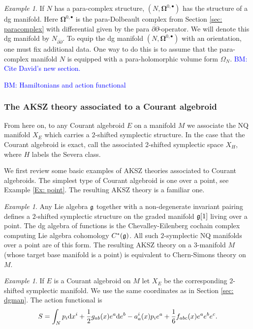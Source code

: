 \documentclass{article}
\newcommand{\p}{\partial}
\newcommand{\pd}{\overline{\p\!\!\!\p}}
\def\d{{\rm d}}
\theoremstyle{definition}
\theoremstyle{remark}
\newtheorem{Ex}[theorem]{Example}
\def\brian{\textcolor{blue}{BM: }\textcolor{blue}}
\begin{document}
\begin{Ex}
If $N$ has a para-complex structure, $(N, \mathbf{\Omega}^{0,\bullet})$ has the structure of a dg manifold. 
Here $\mathbf{\Omega}^{0,\bullet}$ is the para-Dolbeault complex from Section \ref{sec: paracomplex} with differential given by the para $\pd$-operator. 
We will denote this dg manifold by $N_{\pd}$. 
To equip the dg manifold $(N, \mathbf{\Omega}^{0,\bullet})$ with an orientation, one must fix additional data. 
One way to do this is to assume that the para-complex manifold $N$ is equipped with a para-holomorphic volume form $\Omega_N$. \brian{Cite David's new section.}
\end{Ex}

\brian{Hamiltonians and action functional}

\subsubsection{The AKSZ theory associated to a Courant algebroid}

From here on, to any Courant algebroid $E$ on a manifold $M$ we associate the NQ manifold $X_E$ which carries a $2$-shifted symplectic structure. 
In the case that the Courant algebroid is exact, call the associated $2$-shifted symplectic space $X_H$, where $H$ labels the Severa class. 

We first review some basic examples of AKSZ theories associated to Courant algebroids. 
The simplest type of Courant algebroid is one over a point, see Example \ref{Ex: point}. 
The resulting AKSZ theory is a familiar one.

\begin{Ex}\label{ex: cs}
Any Lie algebra $\mathfrak{g}$ together with a non-degenerate invariant pairing defines a $2$-shifted symplectic structure on the graded manifold $\mathfrak{g}[1]$ living over a point. 
The dg algebra of functions is the Chevalley-Eilenberg cochain complex computing Lie algebra cohomology $C^*(\mathfrak{g})$. 
All such $2$-symplectic NQ manifolds over a point are of this form. 
The resulting AKSZ theory on a $3$-manifold $M$ (whose target base manifold is a point) is equivalent to Chern-Simons theory on $M$. 
\end{Ex}

\begin{Ex} \label{ex: exact CA}
If $E$ is a Courant algebroid on $M$ let $X_E$ be the corresponding $2$-shifted symplectic manifold.
We use the same coordinates as in Section \ref{sec: dgman}.
The action functional is
\[
S = \int_N p_i \d x^i + \frac{1}{2} g_{ab}(x) e^a \d e^b - a_a^i(x) p_i e^a + \frac{1}{6} f_{abc} (x) e^{a} e^b e^c .
\]
\end{Ex}
\end{document}
